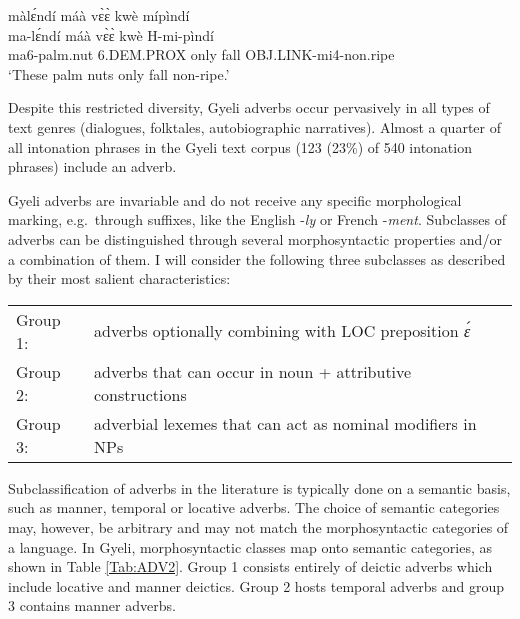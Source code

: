 \begin{exe} 
\ex\label{maNCOMP}
  \glll     màlɛ́ndí máà vɛ̀ɛ̀ kwè mípìndí  \\
	ma-lɛ́ndí máà vɛ̀ɛ̀ kwè H-mi-pìndí \\
              ma6-palm.nut 6.DEM.PROX only fall OBJ.LINK-mi4-non.ripe   \\
    \trans `These palm nuts only fall non-ripe.'
\end{exe}

\noindent Despite this restricted diversity, Gyeli adverbs occur pervasively in all types of text genres (dialogues, folktales, autobiographic narratives). Almost a quarter of all intonation phrases in the Gyeli text corpus (123 (23\%) of 540 intonation phrases) include an adverb.

Gyeli adverbs are invariable and do not receive any specific morphological marking, e.g.\ through suffixes, like the English -{\itshape ly} or French -{\itshape ment}. Subclasses of adverbs can be distinguished through several morphosyntactic properties and/or a combination of them. I will consider the following three subclasses as described by their most salient characteristics:

\begin{center}
\begin{tabular}{ll}
Group 1: & adverbs optionally combining with LOC preposition {\itshape ɛ́} \\
Group 2: & adverbs that can occur in noun + attributive constructions \\
Group 3: & adverbial lexemes that can act as nominal modifiers in NPs  \\
\end{tabular}
\end{center}

Subclassification of adverbs in the literature is typically done on a semantic basis, such as manner, temporal or locative adverbs. The choice of semantic categories may, however, be arbitrary and may not match the morphosyntactic categories of a language. In Gyeli, morphosyntactic classes map onto semantic categories, as shown in Table \ref{Tab:ADV2}.  Group 1 consists entirely of deictic adverbs which include locative and manner deictics.  Group 2 hosts temporal adverbs and group 3 contains manner adverbs.%

